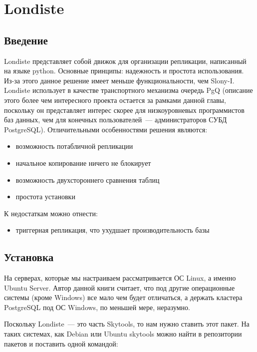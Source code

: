 \section{Londiste}
\label{sec:londiste}

\subsection{Введение}
Londiste представляет собой движок для организации репликации, написанный на языке python.
Основные принципы: надежность и простота использования. Из-за этого данное решение имеет меньше функциональности,
чем Slony-I. Londiste использует в качестве транспортного механизма очередь PgQ  (описание этого более чем интересного
проекта остается за рамками данной главы, поскольку он представляет интерес скорее для низкоуровневых программистов
баз данных, чем для конечных пользователей~--- администраторов СУБД PostgreSQL). Отличительными особенностями решения являются:

\begin{itemize}
  \item возможность потабличной репликации
  \item начальное копирование ничего не блокирует
  \item возможность двухстороннего сравнения таблиц
  \item простота установки
\end{itemize}

К недостаткам можно отнести:

\begin{itemize}
  \item триггерная репликация, что ухудшает производительность базы
\end{itemize}


\subsection{Установка}
На серверах, которые мы настраиваем рассматривается ОС Linux, а именно Ubuntu Server.
Автор данной книги считает, что под другие операционные системы (кроме Windows) все мало чем будет отличаться,
а держать кластера PostgreSQL под ОС Windows, по меньшей мере, неразумно.

Поскольку Londiste~--- это часть Skytools, то нам нужно ставить этот пакет. На таких системах, как Debian или Ubuntu skytools
можно найти в репозитории пакетов и поставить одной командой:
\begin{lstlisting}[label=lst:londiste1,caption=Установка]
% sudo aptitude install skytools
\end{lstlisting}

